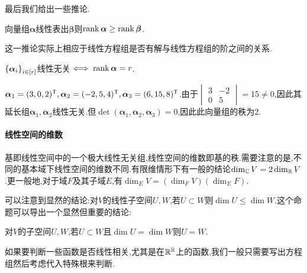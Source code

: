 \documentclass[openany]{book}
\begin{document}
最后我们给出一些推论.
\begin{proposition}
    向量组$\bm{\alpha}$线性表出$\bm{\beta}$则$\operatorname{rank} \bm{\alpha}\geq \operatorname{rank}\bm{\beta}$.
\end{proposition}
这一推论实际上相应于线性方程组是否有解与线性方程组的阶之间的关系.
\begin{proposition}
    $\left\{\bm{\alpha}_i\right\}_{i\in [r]}$线性无关$\iff \operatorname{rank}\bm{\alpha}=r$.
\end{proposition}
\begin{example}
    $\bm{\alpha}_1=(3,0,2)^{\mathsf{T}},\bm{\alpha}_2=(-2,5,4)^{\mathsf{T}},\bm{\alpha}_3=(6,15,8)^{\mathsf{T}}$.由于$\begin{vmatrix}
        3&-2\\0&5
    \end{vmatrix}=15\neq 0$,因此其延长组$\bm{\alpha}_1,\bm{\alpha}_2$线性无关.但$\det(\bm{\alpha}_1,\bm{\alpha}_2,\bm{\alpha}_3)=0$,因此此向量组的秩为2.
\end{example}

\paragraph{线性空间的维数}
基即线性空间中的一个极大线性无关组,线性空间的维数即基的秩.需要注意的是,不同的基本域下线性空间的维数不同.有限维情形下有一般的结论$\dim_{\mathbb{C}} V=2\dim_{\mathbb{R}} V$.更一般地,对于域$F$及其子域$E$,有$\dim_E V=(\dim_F V)(\dim_E F)$.

可以注意到显然的结论:对$V$的线性子空间$U,W$,若$U\subset W$则$\dim U\leq \dim W$.这个命题可以导出一个显然但重要的结论:
\begin{proposition}
    对$V$的子空间$U,W$,若$U\subset W$且$\dim U=\dim W$则$U=W$.
\end{proposition}

\begin{example}
    如果要判断一些函数是否线性相关,尤其是在$\mathbb{R}^{\mathbb{R}}$上的函数,我们一般只需要写出方程组然后考虑代入特殊根来判断.
\end{example}
\end{document}
